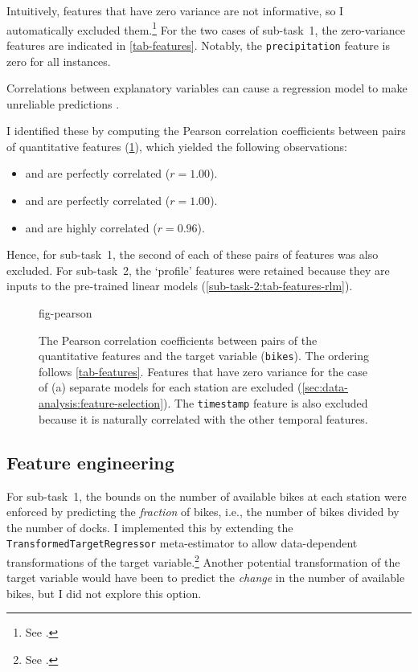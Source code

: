 Intuitively, features that have zero variance are not informative, so I automatically
excluded them.\footnote{See .} For the
two cases of sub-task~1, the zero-variance features are indicated in
\cref{tab-features}.
Notably, the \texttt{precipitation} feature is zero for all instances.

Correlations between explanatory variables can cause a regression model to make
unreliable predictions \parencite{Alin2010}.
\begin{samepage}
  I identified these by computing the Pearson correlation
  coefficients between pairs of quantitative features (\cref{fig-pearson}), which
  yielded the following observations:
  \begin{itemize}
    \item \texttt{\bikesavgfull} and \texttt{\bikesavgshort} are perfectly correlated ($r = 1.00$).
    \item \texttt{\bikeshdiffavgfull} and \texttt{\bikeshdiffavgshort} are perfectly correlated ($r  = 1.00$).
    \item \texttt{\windspeedmax} and \texttt{\windspeedavg} are highly correlated ($r = 0.96$).
  \end{itemize}
\end{samepage}
Hence, for sub-task~1, the second of each of these pairs of features was also excluded.
For sub-task~2, the `profile' features were retained because they are inputs to the
pre-trained linear models (\cref{sub-task-2:tab-features-rlm}).

\begin{figure}
  \centering
  {fig-pearson}
  \caption{
    The Pearson correlation coefficients between pairs of the quantitative features and
    the target variable (\texttt{bikes}).
    The ordering follows \cref{tab-features}.
    Features that have zero variance for the case of (a) separate models for each station
    are excluded (\cref{sec:data-analysis:feature-selection}).
    The \texttt{timestamp} feature is also excluded because it is naturally correlated with
    the other temporal features.
  }
  \label{fig-pearson}
\end{figure}

\subsection{Feature engineering}
\label{sec:data-analysis:feature-engineering}

For sub-task~1, the bounds on the number of available bikes at each station were
enforced by predicting the \emph{fraction} of bikes, i.e., the number of bikes divided
by the number of docks.
I implemented this by extending the \texttt{TransformedTargetRegressor} meta-estimator
to allow data-dependent transformations of the target variable.\footnote{See
  .
}
Another potential transformation of the target variable would have been to predict the
\emph{change} in the number of available bikes, but I did not explore this option.

